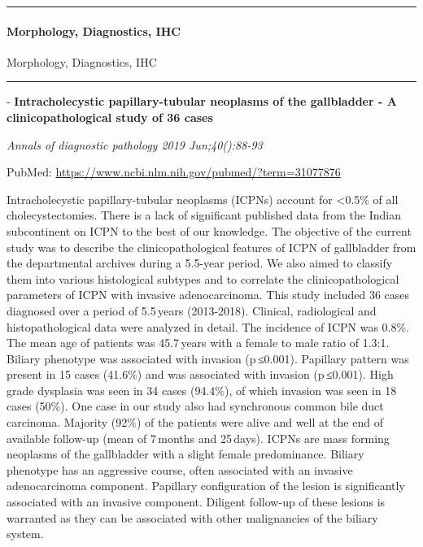 \documentclass[]{article}
\let\oldparagraph\paragraph
\renewcommand{\paragraph}[1]{\oldparagraph{#1}\mbox{}}
\begin{document}
\begin{center}\rule{0.5\linewidth}{\linethickness}\end{center}

\hypertarget{morphology-diagnostics-ihc-2}{%
\paragraph{Morphology, Diagnostics,
IHC}\label{morphology-diagnostics-ihc-2}}

Morphology, Diagnostics, IHC

\begin{center}\rule{0.5\linewidth}{\linethickness}\end{center}

 - \textbf{Intracholecystic papillary-tubular neoplasms of the
gallbladder - A clinicopathological study of 36 cases}

\emph{Annals of diagnostic pathology 2019 Jun;40():88-93}

PubMed: \url{https://www.ncbi.nlm.nih.gov/pubmed/?term=31077876}

Intracholecystic papillary-tubular neoplasms (ICPNs) account for
\textless{}0.5\% of all cholecystectomies. There is a lack of
significant published data from the Indian subcontinent on ICPN to the
best of our knowledge. The objective of the current study was to
describe the clinicopathological features of ICPN of gallbladder from
the departmental archives during a 5.5-year period. We also aimed to
classify them into various histological subtypes and to correlate the
clinicopathological parameters of ICPN with invasive adenocarcinoma.
This study included 36 cases diagnosed over a period of 5.5\,years
(2013-2018). Clinical, radiological and histopathological data were
analyzed in detail. The incidence of ICPN was 0.8\%. The mean age of
patients was 45.7\,years with a female to male ratio of 1.3:1. Biliary
phenotype was associated with invasion (p\,≤0.001). Papillary pattern
was present in 15 cases (41.6\%) and was associated with invasion
(p\,≤0.001). High grade dysplasia was seen in 34 cases (94.4\%), of
which invasion was seen in 18 cases (50\%). One case in our study also
had synchronous common bile duct carcinoma. Majority (92\%) of the
patients were alive and well at the end of available follow-up (mean of
7\,months and 25\,days). ICPNs are mass forming neoplasms of the
gallbladder with a slight female predominance. Biliary phenotype has an
aggressive course, often associated with an invasive adenocarcinoma
component. Papillary configuration of the lesion is significantly
associated with an invasive component. Diligent follow-up of these
lesions is warranted as they can be associated with other malignancies
of the biliary system.
\end{document}

